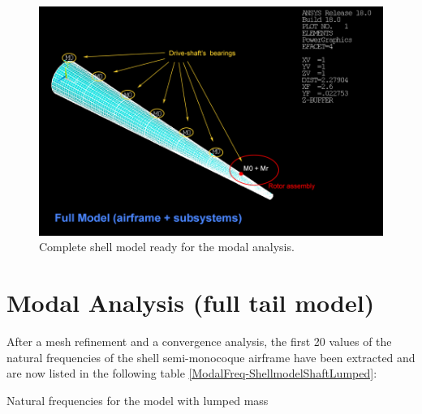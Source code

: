 \medskip
\begin{figure}[h!]
	\begin{center}
		\centering  		 		
		\includegraphics[width=0.95\linewidth]{PICTURES/3_Ecureuil/full_model.png}
	\end{center}
	\caption{Complete shell model ready for the modal analysis.}
\end{figure}	
\vspace{0.5cm}




\clearpage
\section*{Modal Analysis (full tail model)}
\noindent

\noindent
After a mesh refinement and a convergence analysis, the first 20 values of the natural frequencies of the shell semi-monocoque airframe have been extracted and are now listed in the following table \ref{ModalFreq-ShellmodelShaftLumped}:

\begin{table}[!h]
	\centering
	\caption{Natural frequencies for the model with lumped mass}
	\label{ModalFreq-ShellmodelShaftLumped}
\end{table}%


